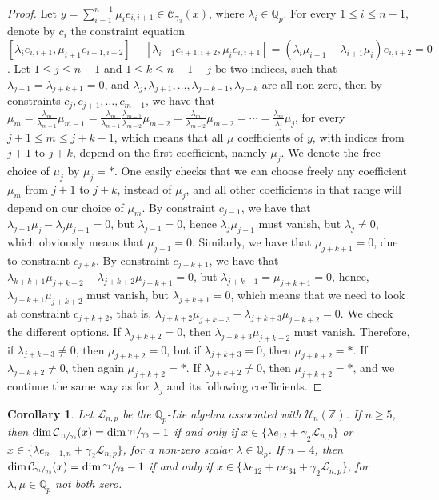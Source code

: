 \documentclass[12pt]{article}
\newtheorem{corollary}[theorem]{Corollary}
\begin{document}
\begin{proof}
Let $y=\sum_{i=1}^{n-1}\mu_i e_{i,i+1}\in\mathcal{C}_{\gamma_3}(x)$, where $\lambda_i\in\mathbb{Q}_p$.
For every $1\leq i\leq n-1$, denote by $c_i$ the constraint equation $[\lambda_i e_{i,i+1},\mu_{i+1}e_{i+1,i+2}]-[\lambda_{i+1}e_{i+1,i+2},\mu_i e_{i,i+1}]=(\lambda_i\mu_{i+1}-\lambda_{i+1}\mu_i)e_{i,i+2}=0$. Let $1\leq j\leq n-1$ and $1\leq k\leq n-1-j$ be two indices, such that $\lambda_{j-1}=\lambda_{j+k+1}=0$, and $\lambda_j,\lambda_{j+1},\dots,\lambda_{j+k-1},\lambda_{j+k}$ are all non-zero, then by constraints $c_j,c_{j+1},\dots,c_{m-1}$, we have that $\mu_m=\frac{\lambda_m}{\lambda_{m-1}}\mu_{m-1}=\frac{\lambda_m}{\lambda_{m-1}}\frac{\lambda_{m-1}}{\lambda_{m-2}}\mu_{m-2}=\frac{\lambda_m}{\lambda_{m-2}}\mu_{m-2}=\cdots=\frac{\lambda_m}{\lambda_j}\mu_j$, for every $j+1\leq m\leq j+k-1$, which means that all $\mu$ coefficients of $y$, with indices from $j+1$ to $j+k$, depend on the first coefficient, namely $\mu_j$. We denote the free choice of $\mu_j$ by $\mu_j=\ast$. One easily checks that we can choose freely any coefficient $\mu_m$ from $j+1$ to $j+k$, instead of $\mu_j$, and all other coefficients in that range will depend on our choice of $\mu_m$. By constraint $c_{j-1}$, we have that $\lambda_{j-1}\mu_j-\lambda_j\mu_{j-1}=0$, but $\lambda_{j-1}=0$, hence $\lambda_j\mu_{j-1}$ must vanish, but $\lambda_j\neq 0$, which obviously means that $\mu_{j-1}=0$. Similarly, we have that $\mu_{j+k+1}=0$, due to constraint $c_{j+k}$. By constraint $c_{j+k+1}$, we have that $\lambda_{k+k+1}\mu_{j+k+2}-\lambda_{j+k+2}\mu_{j+k+1}=0$, but $\lambda_{j+k+1}=\mu_{j+k+1}=0$, hence, $\lambda_{j+k+1}\mu_{j+k+2}$ must vanish, but $\lambda_{j+k+1}=0$, which means that we need to look at constraint $c_{j+k+2}$, that is, $\lambda_{j+k+2}\mu_{j+k+3}-\lambda_{j+k+3}\mu_{j+k+2}=0$. We check the different options.
If $\lambda_{j+k+2}=0$, then $\lambda_{j+k+3}\mu_{j+k+2}$ must vanish. Therefore, if $\lambda_{j+k+3}\neq 0$, then $\mu_{j+k+2}=0$, but if $\lambda_{j+k+3}=0$, then $\mu_{j+k+2}=\ast$. If $\lambda_{j+k+2}\neq 0$, then again $\mu_{j+k+2}=\ast$. If $\lambda_{j+k+2}\neq 0$, then $\mu_{j+k+2}=\ast$, and we continue the same way as for $\lambda_j$ and its following coefficients.
\end{proof}
\begin{corollary}
\label{prop.n.geq.5.centralizer.codimension}
Let $\mathcal{L}_{n,p}$ be the $\mathbb{Q}_p$-Lie algebra associated with $\mathcal{U}_n(\mathbb{Z})$. If $n\geq 5$, then $\dim\mathcal{C}_{\sfrac{\gamma_1}{\gamma_3}}(x)=\dim\sfrac{\gamma_1}{\gamma_3}-1$ if and only if $x\in\{\lambda e_{12}+\gamma_2\mathcal{L}_{n,p}\}$ or $x\in\{\lambda e_{n-1,n}+\gamma_2\mathcal{L}_{n,p}\}$, for a non-zero scalar $\lambda\in\mathbb{Q}_p$. If $n=4$, then $\dim\mathcal{C}_{\sfrac{\gamma_1}{\gamma_3}}(x)=\dim\sfrac{\gamma_1}{\gamma_3}-1$ if and only if $x\in\{\lambda e_{12}+\mu e_{34}+\gamma_2\mathcal{L}_{n,p}\}$, for $\lambda,\mu\in\mathbb{Q}_p$ not both zero.
\end{corollary}
\end{document}

